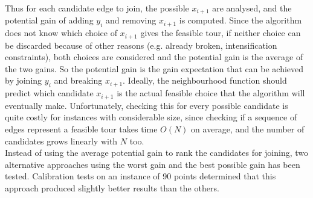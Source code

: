 Thus for each candidate edge to join, the possible $x_{i+1}$ are analysed, and the potential gain of adding $y_i$ and removing $x_{i+1}$ is computed. Since the algorithm does not know which choice of $x_{i+1}$ gives the feasible tour, if neither choice can be discarded because of other reasons (e.g. already broken, intensification constraints), both choices are considered and the potential gain is the average of the two gains. So the potential gain is the gain expectation that can be achieved by joining $y_i$ and breaking $x_{i+1}$. Ideally, the neighbourhood function should predict which candidate $x_{i+1}$ is the actual feasible choice that the algorithm will eventually make. Unfortunately, checking this for every possible candidate is quite costly for instances with considerable size, since checking if a sequence of edges represent a feasible tour takes time $O(N)$ on average, and the number of candidates grows linearly with $N$ too.\\
Instead of using the average potential gain to rank the candidates for joining, two alternative approaches using the worst gain and the best possible gain has been tested. Calibration tests on an instance of 90 points determined that this approach produced slightly better results than the others.


